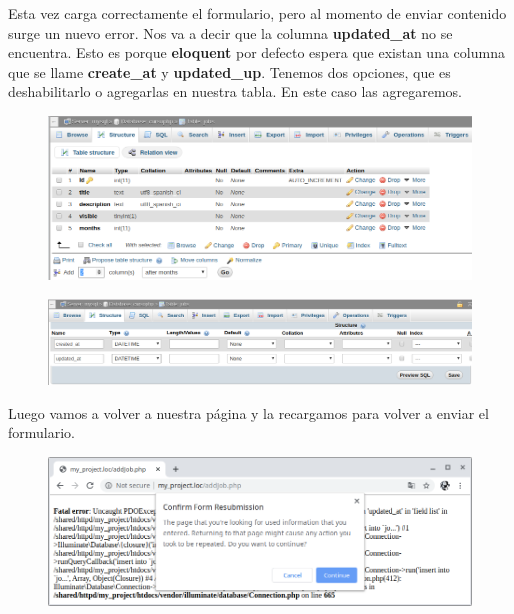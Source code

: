 \documentclass{article}
\begin{document}
Esta vez carga correctamente el formulario, pero al momento de enviar contenido
surge un nuevo error. Nos va a decir que la columna \textbf{updated\_at} no se
encuentra. Esto es porque \textbf{eloquent} por defecto espera que existan una
columna que se llame \textbf{create\_at} y \textbf{updated\_up}. Tenemos dos
opciones, que es deshabilitarlo o agregarlas en nuestra tabla. En este caso las
agregaremos.\\

\begin{figure}[h!]
  \centering
  \includegraphics[scale=0.5]{./Pictures/079_cursophpBD.png}
\end{figure}

\begin{figure}[h!]
  \centering
  \includegraphics[scale=0.5]{./Pictures/080_new_campos.png}
\end{figure}

Luego vamos a volver a nuestra página y la recargamos para volver a enviar el
formulario.\\

\begin{figure}[h!]
  \centering
  \includegraphics[scale=0.5]{./Pictures/081_reenvio_form.png}
\end{figure}
\end{document}
